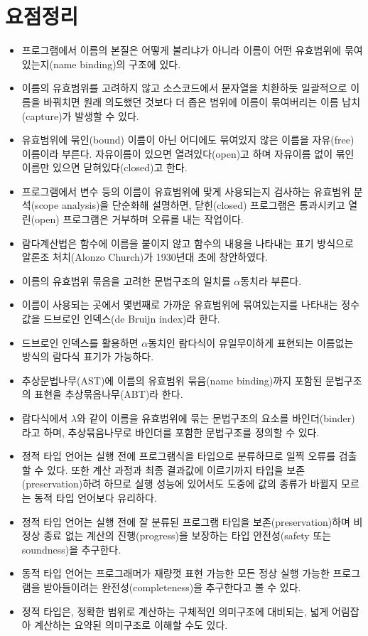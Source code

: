 \section*{요점정리}
\begin{itemize}
 \item 프로그램에서 이름의 본질은 어떻게 불리냐가 아니라 이름이
       어떤 유효범위에 묶여있는지(name binding)의 구조에 있다.
 \item 이름의 유효범위를 고려하지 않고 소스코드에서 문자열을 치환하듯
       일괄적으로 이름을 바꿔치면 원래 의도했던 것보다 더 좁은 범위에
       이름이 묶여버리는 이름 납치(capture)가 발생할 수 있다.
 \item 유효범위에 묶인(bound) 이름이 아닌 어디에도 묶여있지 않은 이름을
       자유(free)이름이라 부른다. 자유이름이 있으면 열려있다(open)고
       하며 자유이름 없이 묶인이름만 있으면 닫혀있다(closed)고 한다.
 \item 프로그램에서 변수 등의 이름이 유효범위에 맞게 사용되는지
       검사하는 유효범위 분석(scope analysis)을 단순화해 설명하면,
       닫힌(closed) 프로그램은 통과시키고 열린(open) 프로그램은
       거부하며 오류를 내는 작업이다.
 \item 람다계산법은 함수에 이름을 붙이지 않고 함수의 내용을 나타내는
       표기 방식으로 알론조 처치(Alonzo Church)가 1930년대 초에
       창안하였다.
 \item 이름의 유효범위 묶음을 고려한 문법구조의 일치를
       $\alpha$동치라 부른다.
 \item 이름이 사용되는 곳에서 몇번째로 가까운 유효범위에 묶여있는지를
       나타내는 정수값을 드브로인 인덱스(de Bruijn index)라 한다.
 \item 드브로인 인덱스를 활용하면 $\alpha$동치인 람다식이 유일무이하게
       표현되는 이름없는 방식의 람다식 표기가 가능하다.
 \item 추상문법나무(AST)에 이름의 유효범위 묶음(name binding)까지
       포함된 문법구조의 표현을 추상묶음나무(ABT)라 한다.
 \item 람다식에서 $\lambda$와 같이 이름을 유효범위에 묶는 문법구조의
       요소를 바인더(binder)라고 하며, 추상묶음나무로 바인더를
       포함한 문법구조를 정의할 수 있다.
 \item 정적 타입 언어는 실행 전에 프로그램식을 타입으로 분류하므로
       일찍 오류를 검출할 수 있다. 또한 계산 과정과 최종 결과값에
       이르기까지 타입을 보존(preservation)하려 하므로 실행 성능에
       있어서도 도중에 값의 종류가 바뀔지 모르는 동적 타입 언어보다
       유리하다.
 \item 정적 타입 언어는 실행 전에 잘 분류된 프로그램 타입을
       보존(preservation)하며 비정상 종료 없는 계산의 진행(progress)을
       보장하는 타입 안전성(safety 또는 soundness)을 추구한다.
 \item 동적 타입 언어는 프로그래머가 재량껏 표현 가능한 모든
       정상 실행 가능한 프로그램을 받아들이려는 완전성(completeness)을
       추구한다고 볼 수 있다.
 \item 정적 타입은, 정확한 범위로 계산하는 구체적인 의미구조에 대비되는,
       넓게 어림잡아 계산하는 요약된 의미구조로 이해할 수도 있다.
\end{itemize}

